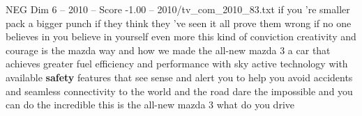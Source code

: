 \begin{textsample}{NEG Dim 6 – 2010 – Score -1.00 – 2010/tv\_com\_2010\_83.txt}  \label{ex:f6_neg_050}
if you 're smaller pack a bigger punch if they think they 've seen it all prove them wrong if no one believes in you believe in yourself even more this kind of conviction creativity and courage is the mazda way and how we made the all-new mazda 3 a car that achieves greater fuel efficiency and performance with sky active technology with available \textbf{safety} features that see sense and alert you to help you avoid accidents and seamless connectivity to the world and the road dare the impossible and you can do the incredible this is the all-new mazda 3 what do you drive

\end{textsample}
